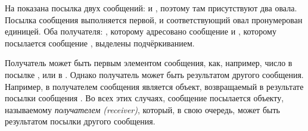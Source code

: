 \documentclass[a4paper,10pt,twoside]{book}
\begin{document}
На  показана посылка двух сообщений:  и , поэтому там присутствуют два овала. Посылка сообщения  выполняется первой, и соответствующий овал пронумерован единицей. Оба получателя: , которому адресовано сообщение  и , которому посылается сообщение , выделены подчёркиванием.

Получатель может быть первым элементом сообщения, как, например, число  в посылке , или  в . Однако получатель может быть результатом другого сообщения. Например, в  получателем сообщения  является объект, возвращаемый в результате посылки сообщения . Во всех этих случаях, сообщение посылается объекту, называемому \emph{получателем (receiver)}, который, в свою очередь, может быть результатом посылки другого сообщения.
\end{document}
